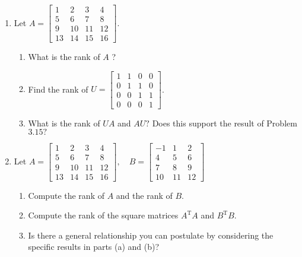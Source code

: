 \documentclass[../main.tex]{subfiles}
\begin{document}
\begin{enumerate}[label=\textbf{3.\arabic*}, noitemsep]
\item Let $A=\left[\begin{array}{cccc}1 & 2 & 3 & 4 \\ 5 & 6 & 7 & 8 \\ 9 & 10 & 11 & 12 \\ 13 & 14 & 15 & 16\end{array}\right]$.
	\begin{enumerate}[label=\textbf{\alph*. }, noitemsep]
	\item What is the rank of $A$ ?
	\item Find the rank of $U=\left[\begin{array}{llll}1 & 1 & 0 & 0 \\ 0 & 1 & 1 & 0 \\ 0 & 0 & 1 & 1 \\ 0 & 0 & 0 & 1\end{array}\right]$.
	\item  What is the rank of $U A$ and $A U ?$ Does this support the result of Problem $3.15 ?$
	\end{enumerate}

\item Let $A=\left[\begin{array}{cccc}1 & 2 & 3 & 4 \\ 5 & 6 & 7 & 8 \\ 9 & 10 & 11 & 12 \\ 13 & 14 & 15 & 16\end{array}\right], \quad B=\left[\begin{array}{ccc}-1 & 1 & 2 \\ 4 & 5 & 6 \\ 7 & 8 & 9 \\ 10 & 11 & 12\end{array}\right]$
	\begin{enumerate}[label=\textbf{\alph*. }, noitemsep]
	\item Compute the rank of $A$ and the rank of $B$.
	\item Compute the rank of the square matrices $A^{\mathrm{T}} A$ and $B^{\mathrm{T}} B$.
	\item Is there a general relationship you can postulate by considering the specific results in parts (a) and (b)?
	\end{enumerate}
\end{enumerate}

\clearpage
\clearpage

\end{document}
